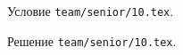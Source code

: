 \problem
Условие \texttt{team/senior/10.tex}.

\solution Решение \texttt{team/senior/10.tex}.
\endproblem

